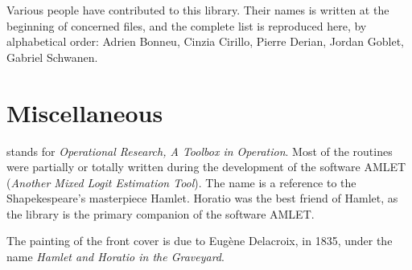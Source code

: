 Various people have contributed to this library.
Their names is written at the beginning of concerned files, and the
complete list is reproduced here, by alphabetical order: Adrien
Bonneu, Cinzia Cirillo, Pierre Derian, Jordan Goblet, Gabriel Schwanen.

\section{Miscellaneous}

\name{} stands for {\sl Operational Research, A Toolbox in Operation}.
Most of the routines were partially or totally written during
the development of the software {\sf AMLET} ({\sl Another Mixed Logit
Estimation Tool}).
The name is a reference to the Shapekespeare's masterpiece Hamlet.
Horatio was the best friend of Hamlet, as the library \name{} is the
primary companion of the software {\sf AMLET}.

The painting of the front cover is due to Eug\`ene Delacroix, in 1835,
under the name {\sl  Hamlet and Horatio in the Graveyard}.

